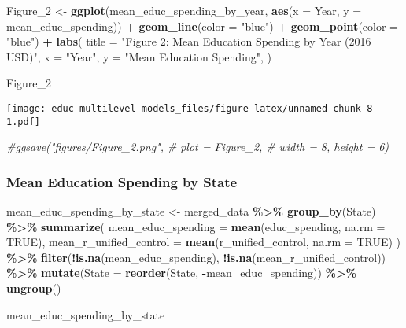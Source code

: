 \documentclass[
]{article}
\newenvironment{Shaded}{\begin{snugshade}}{\end{snugshade}}
\newcommand{\AttributeTok}[1]{\textcolor[rgb]{0.13,0.29,0.53}{#1}}
\newcommand{\CommentTok}[1]{\textcolor[rgb]{0.56,0.35,0.01}{\textit{#1}}}
\newcommand{\ConstantTok}[1]{\textcolor[rgb]{0.56,0.35,0.01}{#1}}
\newcommand{\FunctionTok}[1]{\textcolor[rgb]{0.13,0.29,0.53}{\textbf{#1}}}
\newcommand{\NormalTok}[1]{#1}
\newcommand{\OtherTok}[1]{\textcolor[rgb]{0.56,0.35,0.01}{#1}}
\newcommand{\SpecialCharTok}[1]{\textcolor[rgb]{0.81,0.36,0.00}{\textbf{#1}}}
\newcommand{\StringTok}[1]{\textcolor[rgb]{0.31,0.60,0.02}{#1}}
\begin{document}
\begin{Shaded}
\begin{Highlighting}[]
\NormalTok{Figure\_2 }\OtherTok{\textless{}{-}} \FunctionTok{ggplot}\NormalTok{(mean\_educ\_spending\_by\_year, }\FunctionTok{aes}\NormalTok{(}\AttributeTok{x =}\NormalTok{ Year, }\AttributeTok{y =}\NormalTok{ mean\_educ\_spending)) }\SpecialCharTok{+}
  \FunctionTok{geom\_line}\NormalTok{(}\AttributeTok{color =} \StringTok{"blue"}\NormalTok{) }\SpecialCharTok{+}
  \FunctionTok{geom\_point}\NormalTok{(}\AttributeTok{color =} \StringTok{"blue"}\NormalTok{) }\SpecialCharTok{+}
  \FunctionTok{labs}\NormalTok{(}
    \AttributeTok{title =} \StringTok{"Figure 2: Mean Education Spending by Year (2016 USD)"}\NormalTok{,}
    \AttributeTok{x =} \StringTok{"Year"}\NormalTok{,}
    \AttributeTok{y =} \StringTok{"Mean Education Spending"}\NormalTok{,}
\NormalTok{  )}

\NormalTok{Figure\_2}
\end{Highlighting}
\end{Shaded}

\texttt{[image: educ-multilevel-models\_files/figure-latex/unnamed-chunk-8-1.pdf]}

\begin{Shaded}
\begin{Highlighting}[]
\CommentTok{\#ggsave("figures/Figure\_2.png", }
\CommentTok{\#       plot = Figure\_2, }
\CommentTok{\#       width = 8, height = 6)}
\end{Highlighting}
\end{Shaded}

\hypertarget{mean-education-spending-by-state}{%
\subsubsection{Mean Education Spending by
State}\label{mean-education-spending-by-state}}

\begin{Shaded}
\begin{Highlighting}[]
\NormalTok{mean\_educ\_spending\_by\_state }\OtherTok{\textless{}{-}}\NormalTok{ merged\_data }\SpecialCharTok{\%\textgreater{}\%}
  \FunctionTok{group\_by}\NormalTok{(State) }\SpecialCharTok{\%\textgreater{}\%}
  \FunctionTok{summarize}\NormalTok{(}
    \AttributeTok{mean\_educ\_spending =} \FunctionTok{mean}\NormalTok{(educ\_spending, }\AttributeTok{na.rm =} \ConstantTok{TRUE}\NormalTok{),}
    \AttributeTok{mean\_r\_unified\_control =} \FunctionTok{mean}\NormalTok{(r\_unified\_control, }\AttributeTok{na.rm =} \ConstantTok{TRUE}\NormalTok{)}
\NormalTok{  ) }\SpecialCharTok{\%\textgreater{}\%}
  \FunctionTok{filter}\NormalTok{(}\SpecialCharTok{!}\FunctionTok{is.na}\NormalTok{(mean\_educ\_spending), }\SpecialCharTok{!}\FunctionTok{is.na}\NormalTok{(mean\_r\_unified\_control)) }\SpecialCharTok{\%\textgreater{}\%}
  \FunctionTok{mutate}\NormalTok{(}\AttributeTok{State =} \FunctionTok{reorder}\NormalTok{(State, }\SpecialCharTok{{-}}\NormalTok{mean\_educ\_spending)) }\SpecialCharTok{\%\textgreater{}\%}  
  \FunctionTok{ungroup}\NormalTok{()}

\NormalTok{mean\_educ\_spending\_by\_state}
\end{Highlighting}
\end{Shaded}
\end{document}
